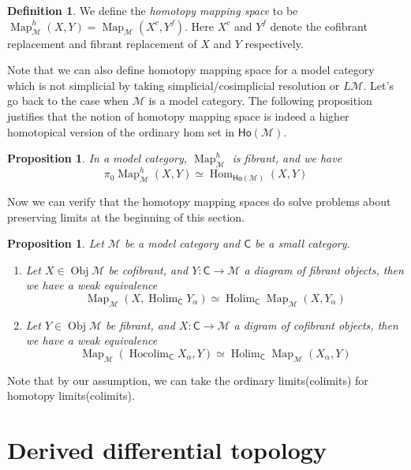 \documentclass[12pt]{amsart}
\newtheorem{prop}[thm]{Proposition}
\theoremstyle{definition}
\newtheorem{defn}[thm]{Definition}
\theoremstyle{remark}
\numberwithin{equation}{section}
\newcommand{\CC}{{\mathsf C}}
\newcommand{\cm}{{\mathcal{M}}}
\newcommand{\1}{{\mathbb{1}}}
\newcommand{\ob}{\operatorname{Obj}}
\newcommand{\ho}{\mathsf{Ho}}
\newcommand{\holim}{\operatorname{Holim}}
\newcommand{\hocolim}{\operatorname{Hocolim}}
\newcommand{\Hom}{\operatorname{Hom}}
\newcommand{\map}{\operatorname{Map}}
\begin{document}
\begin{defn}
	We define the {\it homotopy mapping space} to be $\map^h_{\cm} (X,Y) =\map_{\cm}(X^c, Y^f)$. Here $X^c$ and $Y^f$ denote the cofibrant replacement and fibrant replacement of $X$ and $Y$ respectively.
\end{defn}
Note that we can also define homotopy mapping space for a model category which is not simplicial by taking simplicial/cosimplicial resolution or $L\cm$. Let's go back to the case when $\cm$ is a model category. The following proposition justifies that the notion of homotopy mapping space is indeed a higher homotopical version of the ordinary hom set in $\ho(\cm)$.
\begin{prop}
	In a model category, $\map^h_{\cm}$ is fibrant, and we have
	\begin{equation*}
	\pi_0 \map^h_{\cm}(X,Y) \simeq \Hom_{\ho(\cm)}(X,Y)
	\end{equation*}
\end{prop} 
Now we can verify that the homotopy mapping spaces do solve problems about preserving limits at the beginning of this section.
\begin{prop}Let $\cm$ be a model category and $\CC$ be a small category.
	\begin{enumerate}
		\item Let $X\in \ob\cm$ be cofibrant, and $Y: \CC \to \cm$ a diagram of fibrant objects, then we have a weak equivalence
		\begin{equation*}
		\map_{\cm}(X, \holim_{\CC}Y_{\alpha} ) \simeq \holim_{\CC} \map_{\cm}(X, Y_{\alpha})
		\end{equation*}
		\item Let $Y\in \ob\cm$ be fibrant, and $X: \CC \to \cm$ a digram of cofibrant objects, then we have a weak equivalence
		\begin{equation*}
		\map_{\cm}(\hocolim_{\CC}X_{\alpha}, Y ) \simeq \holim_{\CC} \map_{\cm}(X_{\alpha}, Y)
		\end{equation*}
	\end{enumerate}
\end{prop}

Note that by our assumption, we can take the ordinary limits(colimits) for homotopy limits(colimits).
\section{Derived differential topology}
\end{document}
